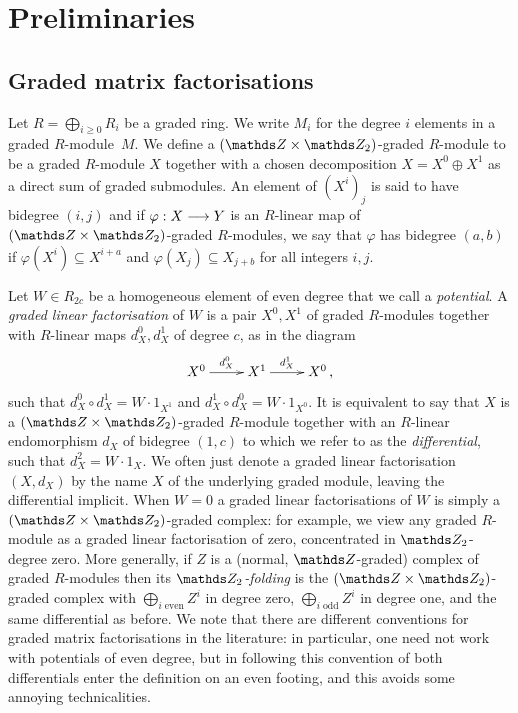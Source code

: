 \documentclass{compositio}
\theoremstyle{definition}
\numberwithin{equation}{section}
\begin{document}
\section{Preliminaries}
\label{preliminaries}


\subsection{Graded matrix factorisations}

Let $R = \bigoplus_{i \ge 0} R_i$ be a graded ring. We write $M_i$ for the degree $i$ elements in a graded $R$-module~$M$. We define a $(\ZZ \times \Ztwo)$-graded $R$-module to be a graded $R$-module $X$ together with a chosen decomposition $X = X^0 \oplus X^1$ as a direct sum of graded submodules. An element of $(X^i)_j$ is said to have bidegree $(i,j)$ and if $\varphi: X \longrightarrow Y$ is an $R$-linear map of $(\ZZ \times \Ztwo)$-graded $R$-modules, we say that $\varphi$ has bidegree $(a,b)$ if $\varphi(X^i) \subseteq X^{i+a}$ and $\varphi(X_j) \subseteq X_{j+b}$ for all integers $i,j$.

Let $W \in R_{2c}$ be a homogeneous element of even degree that we call a \emph{potential}. A \emph{graded linear factorisation} of $W$ is a pair $X^0, X^1$ of graded $R$-modules together with $R$-linear maps $d_X^0, d_X^1$ of degree $c$, as in the diagram
\[
\xymatrix{
X^0 \ar[r]^-{d_X^0} & X^1 \ar[r]^-{d_X^1} & X^0\,,
}
\]
such that $d_X^0 \circ d_X^1 = W \cdot 1_{X^1}$ and $d_X^1 \circ d_X^0  = W \cdot 1_{X^0}$. It is equivalent to say that $X$ is a $(\ZZ \times \Ztwo)$-graded $R$-module together with an $R$-linear endomorphism $d_X$ of bidegree $(1,c)$ to which we refer to as the \emph{differential}, such that $d_X^2 = W \cdot 1_X$. We often just denote a graded linear factorisation $(X,d_X)$ by the name $X$ of the underlying graded module, leaving the differential implicit. When $W = 0$ a graded linear factorisations of $W$ is simply a $(\ZZ \times \Ztwo)$-graded complex: for example, we view any graded $R$-module as a graded linear factorisation of zero, concentrated in $\nZ_{2}$-degree zero. More generally, if $Z$ is a (normal, $\ZZ$-graded) complex of graded $R$-modules then its \emph{$\Ztwo$-folding} is the $(\ZZ \times \Ztwo)$-graded complex with $\bigoplus_{i\;\text{even}} Z^i$ in degree zero, $\bigoplus_{i\;\text{odd}} Z^i$ in degree one, and the same differential as before. We note that there are different conventions for graded matrix factorisations in the literature: in particular, one need not work with potentials of even degree, but in following this convention of \cite{kr0401268} both differentials enter the definition on an even footing, and this avoids some annoying technicalities.
\end{document}
